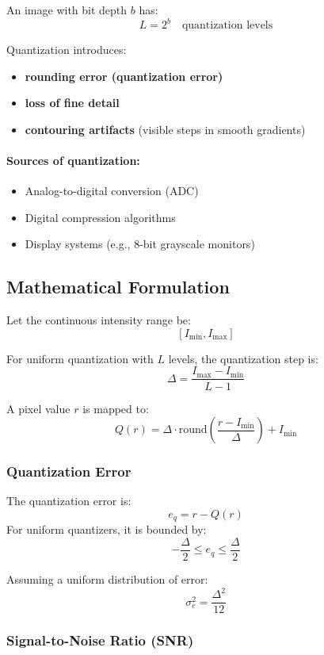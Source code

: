 \documentclass{AnantDocumentation}
\begin{document}
An image with bit depth $b$ has:
\[
L = 2^b \quad \text{quantization levels}
\]

Quantization introduces:
\begin{itemize}
\item \textbf{rounding error (quantization error)}
\item \textbf{loss of fine detail}
\item \textbf{contouring artifacts} (visible steps in smooth gradients)
\end{itemize}

\paragraph{Sources of quantization:}
\begin{itemize}
\item Analog-to-digital conversion (ADC)
\item Digital compression algorithms
\item Display systems (e.g., 8-bit grayscale monitors)
\end{itemize}

\subsection{Mathematical Formulation}

Let the continuous intensity range be:
\[
[I_{\min}, I_{\max}]
\]

For uniform quantization with $L$ levels, the quantization step is:
\[
\Delta = \frac{I_{\max} - I_{\min}}{L - 1}
\]

A pixel value $r$ is mapped to:
\[
Q(r) = \Delta \cdot \text{round}\left(\frac{r-I_{\min}}{\Delta}\right) + I_{\min}
\]

\subsubsection{Quantization Error}

The quantization error is:
\[
e_q = r - Q(r)
\]
For uniform quantizers, it is bounded by:
\[
-\frac{\Delta}{2} \leq e_q \leq \frac{\Delta}{2}
\]

Assuming a uniform distribution of error:
\[
\sigma_{e}^{2} = \frac{\Delta^2}{12}
\]

\subsubsection{Signal-to-Noise Ratio (SNR)}
\end{document}
